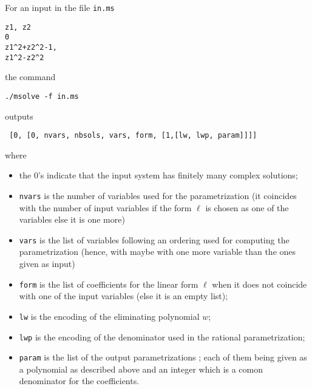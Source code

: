 \documentclass[a4paper,english,11pt]{scrartcl}
\theoremstyle{definition}
\theoremstyle{remark}
\begin{document}
For an input in the file \verb+in.ms+
\begin{tcolorbox}
\begin{verbatim}
z1, z2
0
z1^2+z2^2-1,
z1^2-z2^2
\end{verbatim}
\end{tcolorbox}
the command
\begin{tcolorbox}
\begin{verbatim}
./msolve -f in.ms
\end{verbatim}
\end{tcolorbox}
\msolve outputs
\begin{verbatim}
 [0, [0, nvars, nbsols, vars, form, [1,[lw, lwp, param]]]]
\end{verbatim}
where
\begin{itemize}
\item the $0$'s indicate that the input system has finitely
  many complex solutions;
\item \texttt{nvars} is the number of variables used for the parametrization (it
  coincides with the number of input variables if the form $\ell$ is chosen
  as one of the variables else it is one more)
\item \texttt{vars} is the list of variables following an ordering used for
  computing the parametrization (hence, with maybe with one
  more variable than the ones given as input)
\item \texttt{form} is the list of coefficients for the linear form $\ell$ when
  it does not coincide with one of the input variables (else it is an empty list);
\item \texttt{lw} is the encoding of the eliminating polynomial $w$;
\item \texttt{lwp} is the encoding of the denominator used in the rational
  parametrization;
\item \texttt{param} is the list of the output parametrizations ; each of them
  being given as a polynomial as described above and an integer which is a comon
  denominator for the coefficients.
\end{itemize}



\end{document}
